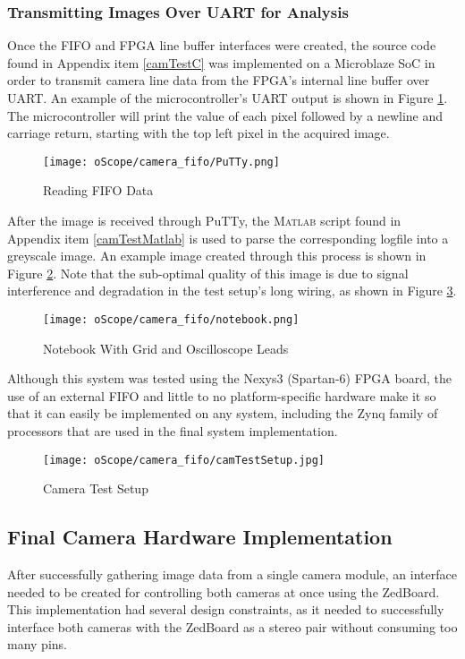 \subsubsection{Transmitting Images Over UART for Analysis} \label{UARTimg}
Once the FIFO and FPGA line buffer interfaces were created, the source code found in Appendix item \ref{camTestC} was implemented on a Microblaze SoC in order to transmit camera line data from the FPGA's internal line buffer over UART. An example of the microcontroller's UART output is shown in Figure \ref{PuTTYfifoData}. The microcontroller will print the value of each pixel followed by a newline and carriage return, starting with the top left pixel in the acquired image. 
\begin{figure}[H]
	\centerline{\texttt{[image: oScope/camera\_fifo/PuTTy.png]}}
	\caption{Reading FIFO Data}
	\label{PuTTYfifoData}
\end{figure}
\par
After the image is received through PuTTy, the \textsc{Matlab} script found in Appendix item \ref{camTestMatlab} is used to parse the corresponding logfile into a greyscale image. An example image created through this process is shown in Figure \ref{notebookImage}. Note that the sub-optimal quality of this image is due to signal interference and degradation in the test setup's long wiring, as shown in Figure \ref{camTestSetup}. 
\begin{figure}[H]
	\centerline{\texttt{[image: oScope/camera\_fifo/notebook.png]}}
	\caption{Notebook With Grid and Oscilloscope Leads}
	\label{notebookImage}
\end{figure}
\par
Although this system was tested using the Nexys3 (Spartan-6) FPGA board, the use of an external FIFO and little to no platform-specific hardware make it so that it can easily be implemented on any system, including the Zynq family of processors that are used in the final system implementation.   
\begin{figure}[H]
	\centerline{\texttt{[image: oScope/camera\_fifo/camTestSetup.jpg]}}
	\caption{Camera Test Setup}
	\label{camTestSetup}
\end{figure}

\subsection{Final Camera Hardware Implementation}
After successfully gathering image data from a single camera module, an interface needed to be created for controlling both cameras at once using the ZedBoard. This implementation had several design constraints, as it needed to successfully interface both cameras with the ZedBoard as a stereo pair without consuming too many pins. 
